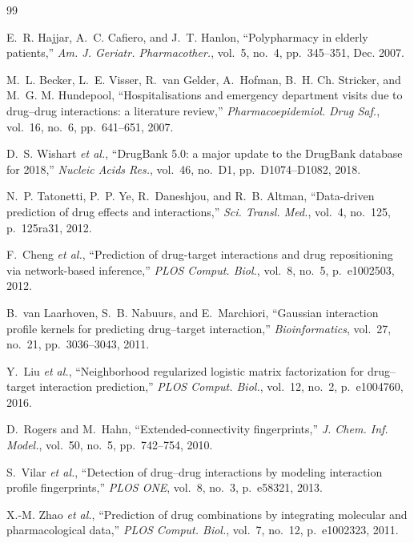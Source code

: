\documentclass[conference]{IEEEtran}
\begin{document}
\begin{thebibliography}{99}

E.~R. Hajjar, A.~C. Cafiero, and J.~T. Hanlon,
``Polypharmacy in elderly patients,''
\textit{Am. J. Geriatr. Pharmacother.}, vol.~5, no.~4,
pp.~345--351, Dec. 2007.

M.~L. Becker, L.~E. Visser, R.~van Gelder, A.~Hofman, B.~H. Ch. Stricker,
and M.~G. M. Hundepool,
``Hospitalisations and emergency department visits due to drug--drug interactions:
a literature review,''
\textit{Pharmacoepidemiol. Drug Saf.}, vol.~16, no.~6, pp.~641--651, 2007.

D.~S. Wishart \textit{et al.},
``DrugBank 5.0: a major update to the DrugBank database for 2018,''
\textit{Nucleic Acids Res.}, vol.~46, no.~D1, pp.~D1074--D1082, 2018.

N.~P. Tatonetti, P.~P. Ye, R.~Daneshjou, and R.~B. Altman,
``Data-driven prediction of drug effects and interactions,''
\textit{Sci. Transl. Med.}, vol.~4, no.~125, p.~125ra31, 2012.

F.~Cheng \textit{et al.},
``Prediction of drug-target interactions and drug repositioning via network-based
inference,''
\textit{PLOS Comput. Biol.}, vol.~8, no.~5, p.~e1002503, 2012.

B.~van Laarhoven, S.~B. Nabuurs, and E.~Marchiori,
``Gaussian interaction profile kernels for predicting drug--target interaction,''
\textit{Bioinformatics}, vol.~27, no.~21, pp.~3036--3043, 2011.

Y.~Liu \textit{et al.},
``Neighborhood regularized logistic matrix factorization for drug--target interaction
prediction,''
\textit{PLOS Comput. Biol.}, vol.~12, no.~2, p.~e1004760, 2016.

D.~Rogers and M.~Hahn,
``Extended-connectivity fingerprints,''
\textit{J. Chem. Inf. Model.}, vol.~50, no.~5, pp.~742--754, 2010.

S.~Vilar \textit{et al.},
``Detection of drug--drug interactions by modeling interaction profile fingerprints,''
\textit{PLOS ONE}, vol.~8, no.~3, p.~e58321, 2013.

X.-M. Zhao \textit{et al.},
``Prediction of drug combinations by integrating molecular and pharmacological data,''
\textit{PLOS Comput. Biol.}, vol.~7, no.~12, p.~e1002323, 2011.


\end{thebibliography}
\end{document}

